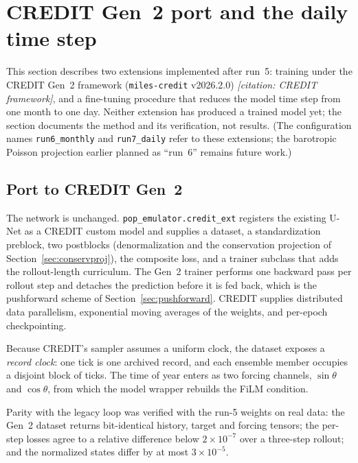 \documentclass[11pt]{article}
\begin{document}
\section{CREDIT Gen~2 port and the daily time step}
\label{sec:credit-daily}

This section describes two extensions implemented after run~5: training under
the CREDIT Gen~2 framework (\texttt{miles-credit} v2026.2.0)
\textit{[citation: CREDIT framework]}, and a fine-tuning procedure that reduces
the model time step from one month to one day. Neither extension has produced a
trained model yet; the section documents the method and its verification, not
results. (The configuration names \texttt{run6\_monthly} and
\texttt{run7\_daily} refer to these extensions; the barotropic Poisson projection
earlier planned as ``run~6'' remains future work.)

\subsection{Port to CREDIT Gen~2}

The network is unchanged. \texttt{pop\_emulator.credit\_ext} registers the
existing U-Net as a CREDIT custom model and supplies a dataset, a
standardization preblock, two postblocks (denormalization and the conservation
projection of Section~\ref{sec:conservproj}), the composite loss, and a trainer
subclass that adds the rollout-length curriculum. The Gen~2 trainer performs one
backward pass per rollout step and detaches the prediction before it is fed
back, which is the pushforward scheme of Section~\ref{sec:pushforward}. CREDIT
supplies distributed data parallelism, exponential moving averages of the
weights, and per-epoch checkpointing.

Because CREDIT's sampler assumes a uniform clock, the dataset exposes a
\emph{record clock}: one tick is one archived record, and each ensemble member
occupies a disjoint block of ticks. The time of year enters as two forcing
channels, $\sin\theta$ and $\cos\theta$, from which the model wrapper rebuilds
the FiLM condition.

Parity with the legacy loop was verified with the run-5 weights on real data:
the Gen~2 dataset returns bit-identical history, target and forcing tensors;
the per-step losses agree to a relative difference below $2\times10^{-7}$ over
a three-step rollout; and the normalized states differ by at most
$3\times10^{-5}$.
\end{document}
